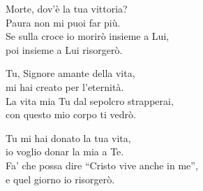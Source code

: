 

\spazio

\strofa Morte, dov'è la tua vittoria?\\
Paura non mi puoi far più.\\
Se sulla croce io morirò insieme a Lui,\\
poi insieme a Lui risorgerò.

\spazio
 

\spazio

\strofa Tu, Signore amante della vita,\\
mi hai creato per l'eternità.\\
La vita mia Tu dal sepolcro strapperai,\\
con questo mio corpo ti vedrò.

\spazio


\spazio

\strofa Tu mi hai donato la tua vita,\\
io voglio donar la mia a Te.\\
Fa' che possa dire ``Cristo vive anche in me'',\\
e quel giorno io risorgerò.

\spazio

